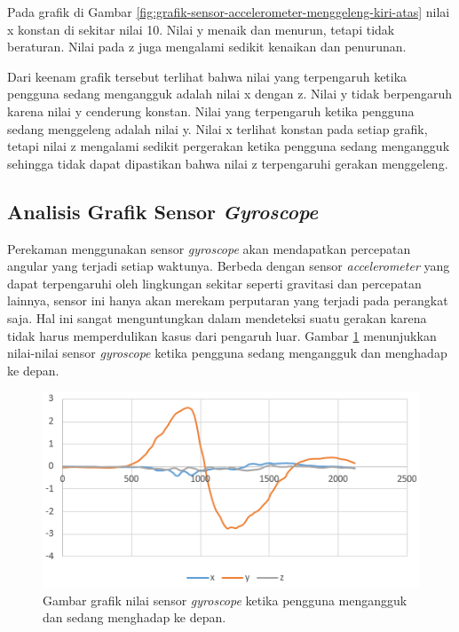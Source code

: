 Pada grafik di Gambar \ref{fig:grafik-sensor-accelerometer-menggeleng-kiri-atas} nilai x konstan di sekitar nilai 10. Nilai y menaik dan menurun, tetapi tidak beraturan. Nilai pada z juga mengalami sedikit kenaikan dan penurunan. 

Dari keenam grafik tersebut terlihat bahwa nilai yang terpengaruh ketika pengguna sedang mengangguk adalah nilai x dengan z. Nilai y tidak berpengaruh karena nilai y cenderung konstan. Nilai yang terpengaruh ketika pengguna sedang menggeleng adalah nilai y. Nilai x terlihat konstan pada setiap grafik, tetapi nilai z mengalami sedikit pergerakan ketika pengguna sedang mengangguk sehingga tidak dapat dipastikan bahwa nilai z terpengaruhi gerakan menggeleng. 

\subsection{Analisis Grafik Sensor \textit{Gyroscope}}
\label{sec:analisis_grafik_sensor_gyroscope}
Perekaman menggunakan sensor \textit{gyroscope} akan mendapatkan percepatan angular yang terjadi setiap waktunya. Berbeda dengan sensor \textit{accelerometer} yang dapat terpengaruhi oleh lingkungan sekitar seperti gravitasi dan percepatan lainnya, sensor ini hanya akan merekam perputaran yang terjadi pada perangkat saja. Hal ini sangat menguntungkan dalam mendeteksi suatu gerakan karena tidak harus memperdulikan kasus dari pengaruh luar. Gambar \ref{fig:grafik-sensor-gyroscope-mengangguk-depan} menunjukkan nilai-nilai sensor \textit{gyroscope} ketika pengguna sedang mengangguk dan menghadap ke depan.


\begin{figure}[htbp]
\centering
\includegraphics[scale=1]{Gambar/grafik-sensor-gyroscope-mengangguk-depan.png}
\caption{Gambar grafik nilai sensor \textit{gyroscope} ketika pengguna mengangguk dan sedang menghadap ke depan.} 
\label{fig:grafik-sensor-gyroscope-mengangguk-depan}
\end{figure}

